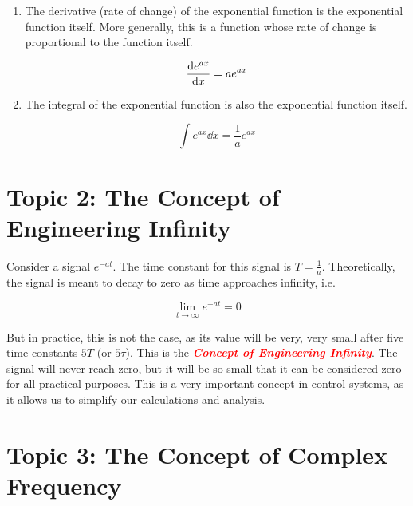\documentclass[
  12pt,
  a4paper,
]{report}
\begin{document}
\begin{enumerate}
\def\labelenumi{\arabic{enumi}.}
\item
  The derivative (rate of change) of the exponential function is the
  exponential function itself. More generally, this is a function whose
  rate of change is proportional to the function itself.

  \label{exp-derivative}
  \begin{equation} 
  \label{eq:exp-derivative}     
  \dv{e^{ax}}{x} = a e^{ax} 
  \end{equation}
\item
  The integral of the exponential function is also the exponential
  function itself.

  \label{exp-integral}
  \begin{equation} 
  \label{eq:exp-integral}     
  \int e^{ax} \dd{x} = \frac{1}{a} e^{ax} 
  \end{equation}
\end{enumerate}

\label{topic2}
\chapter{Topic 2: The Concept of Engineering
Infinity}\label{topic-2-the-concept-of-engineering-infinity}

Consider a signal \(e^{-at}\). The time constant for this signal is
\(T = \frac{1}{a}\). Theoretically, the signal is meant to decay to zero
as time approaches infinity, i.e.

\label{engineering-infinity}
\begin{equation} 
\label{eq:eng-infinity}     
\lim_{t \to \infty} e^{-at} = 0  
\end{equation}

But in practice, this is not the case, as its value will be very, very
small after five time constants \(5T\) (or \(5\tau\)). This is the
\textcolor{red}{\textbf{\textit{Concept of Engineering Infinity}}}. The
signal will never reach zero, but it will be so small that it can be
considered zero for all practical purposes. This is a very important
concept in control systems, as it allows us to simplify our calculations
and analysis.

\chapter{Topic 3: The Concept of Complex
Frequency}\label{topic-3-the-concept-of-complex-frequency}
\end{document}
